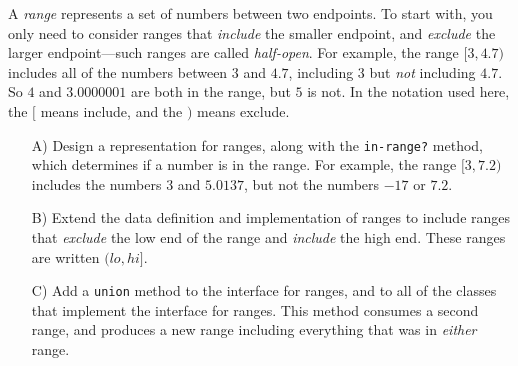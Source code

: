 \documentclass[12pt]{article}                   %
\def\pts#1{\marginpar{\footnotesize \raggedright  \fbox{#1 {\sc Points}}}}
\begin{document}
\vfill\thispagestyle{empty}
\newpage

\fi






\begin{problem}\pts{16}
\noindent 

A \emph{range} represents a set of numbers between two endpoints.  To
start with, you only need to consider ranges that \emph{include} the
smaller endpoint, and \emph{exclude} the larger endpoint---such ranges
are called \emph{half-open}.  For example, the range $[3,4.7)$
includes all of the numbers between $3$ and $4.7$, including $3$ but
\emph{not} including $4.7$. So $4$ and $3.0000001$ are both in the
range, but $5$ is not.  In the notation used here, the $[$ means
include, and the $)$ means exclude.





\smallskip

\noindent
\begin{itemize}
\item[A)\;] Design a representation for ranges, along with the
  \texttt{in-range?} method, which determines if a number is in the
  range.  For example, the range $[3,7.2)$ includes the numbers $3$
  and $5.0137$, but not the numbers $-17$ or $7.2$.

\item[B)\;] Extend the data definition and implementation of ranges to
  include ranges that \emph{exclude} the low end of the range and
  \emph{include} the high end.  These ranges are written $(lo,hi]$.  

\item[C)\;] Add a \texttt{union} method to the interface for ranges,
  and to all of the classes that implement the interface for ranges.
  This method consumes a second range, and produces a new range including
  everything that was in \emph{either} range. 


\end{itemize}
\end{problem}
\end{document}
